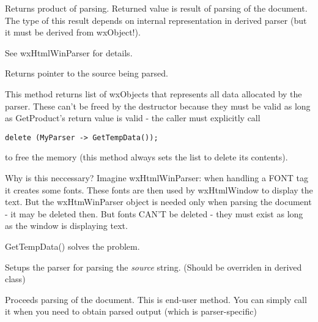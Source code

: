 
Returns product of parsing. Returned value is result of parsing
of the document. The type of this result depends on internal
representation in derived parser (but it must be derived from wxObject!).

See wxHtmlWinParser for details.

\label{wxhtmlparsergetsource}


Returns pointer to the source being parsed.

\label{wxhtmlparsergettempdata}


This method returns list of wxObjects that represents
all data allocated by the parser. These can't be freed
by the destructor because they must be valid as long as
GetProduct's return value is valid - the caller must
explicitly call

\begin{verbatim}
delete (MyParser -> GetTempData());
\end{verbatim}

to free the memory (this method always sets the list to delete its contents).


Why is this neccessary? Imagine wxHtmlWinParser: when handling
a FONT tag it creates some fonts. These fonts are then used by wxHtmlWindow
to display the text. But the wxHtmWinParser object is needed only when parsing
the document - it may be deleted then. But fonts CAN'T be deleted - they
must exist as long as the window is displaying text.

GetTempData() solves the problem.

\label{wxhtmlparserinitparser}


Setups the parser for parsing the {\it source} string. (Should be overriden
in derived class)

\label{wxhtmlparserparse}


Proceeds parsing of the document. This is end-user method. You can simply
call it when you need to obtain parsed output (which is parser-specific)

